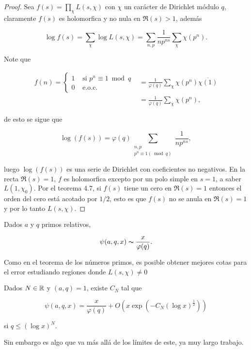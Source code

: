 \begin{proof}
    Sea $f(s)=\prod_\chi L(s,\chi)$ con $\chi$ un carácter de Dirichlet módulo $q$, claramente $f(s)$ es holomorfica y no nula en $\Re(s)>1$, además

    $$\log f(s)=\sum_\chi \log L(s, \chi)=\sum_{n, p} \frac{1}{n p^{n s}} \sum_\chi \chi\left(p^n\right).$$

    Note que 

    \begin{align*}
        f(n)=\begin{cases}
        1 &\text{ si }p^n\equiv 1 \bmod{q}\\
        0 &\text{ e.o.c.}
    \end{cases}&=\frac{1}{\varphi(q)}\sum_\chi \chi(p^n)\overline{\chi(1)}\\
    &=\frac{1}{\varphi(q)}\sum_\chi \chi(p^n)
    ,\end{align*}

    de esto se sigue que 

    $$\log(f(s))=\varphi(q) \sum_{\substack{n, p \\ p^n \equiv 1(\bmod q)}} \frac{1}{n p^{n s}},$$

    luego $\log(f(s))$ es una serie de Dirichlet con coeficientes no negativos. En la recta $\Re(s)=1$, $f$ es holomorfica excepto por un polo simple en $s=1$, a saber $L(1,\chi_0)$. Por el teorema 4.7, si $f(s)$ tiene un cero  en $\Re(s)=1$ entonces el orden del cero está acotado por $1/2$, esto es que $f(s)$ no se anula en $\Re(s)=1$ y por lo tanto $L(s,\chi)$.
\end{proof}

\begin{corollary}
    Dados $a$ y $q$ primos relativos,

    $$\psi(a,q,x)\thicksim \frac{x}{\varphi(q)}.$$
\end{corollary}

Como en el teorema de los números primos, es posible obtener mejores cotas para el error estudiando regiones donde $L(s,\chi)\neq 0$

\begin{theorem}
Dados $N\in \mathbb{R}$ y $(a,q)=1$, existe $C_N$ tal que

$$\psi(a, q, x)=\frac{x}{\varphi(q)}+O\left(x \exp \left(-C_N(\log x)^{\frac{1}{2}}\right)\right)$$

si $q \leq(\log x)^N .$
\end{theorem}

Sin embargo es algo que va más allá de los límites de este, ya muy largo trabajo.